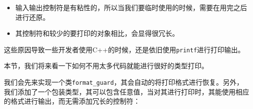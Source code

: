 \begin{itemize}
\item 输入输出控制符是有粘性的，所以当我们要临时使用的时候，需要在用完之后进行还原。

\item 其控制符和较少的要打印的对象相比，会显得很冗长。

\end{itemize}

这些原因导致一些开发者使用C++的时候，还是依旧使用\texttt{printf}进行打印输出。

本节，我们将来看一下如何不用太多代码就能进行很好的类型打印。


我们会先来实现一个类\texttt{format\_guard}，其会自动的将打印格式进行恢复。另外，我们添加了一个包装类型，其可以包含任意值，当对其进行打印时，其能使用相应的格式进行输出，而无需添加冗长的控制符：

